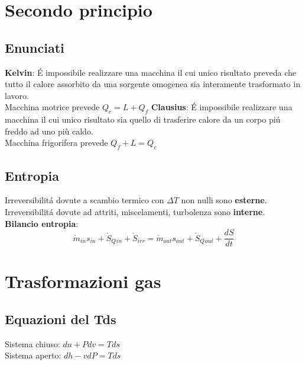 \documentclass[landscape,a4paper]{article}
\begin{document}
\begin{multicols}{4}
\section*{Secondo principio}
\subsection*{Enunciati}
\textbf{Kelvin}: É impossibile realizzare una macchina il cui unico risultato preveda che tutto il calore assorbito da una sorgente omogenea sia interamente trasformato in lavoro. \\
Macchina motrice prevede \(Q_c = L + Q_f\)
\textbf{Clausius}: É impossibile realizzare una macchina il cui unico risultato sia quello di trasferire calore da un corpo piú freddo ad uno più caldo. \\
Macchina frigorifera prevede \(Q_f + L = Q_c\)
\subsection*{Entropia}
Irreversibilitá dovute a scambio termico con \(\Delta T\) non nulli sono \textbf{esterne}. \\
Irreversibilitá dovute ad attriti, miscelamenti, turbolenza sono \textbf{interne}. \\
\textbf{Bilancio entropia}: \\
\[\dot{m}_{in}s_{in} + \dot{S}_Q{_{in}} + \dot{S}_{irr} = \dot{m}_{out}s_{out} + \dot{S}_Q{_{out}} + \frac{dS}{dt}\]

\section*{Trasformazioni gas}
\subsection*{Equazioni del Tds}
Sistema chiuso: \(du + Pdv = Tds\) \\
Sistema aperto: \(dh -vdP = Tds\)

\end{multicols}
\end{document}
